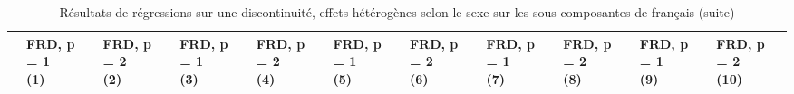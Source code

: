 \documentclass[
]{book}
\begin{document}
\begin{ThreePartTable}
\begin{longtable}[t]{lllllllllll}
\caption[]{\label{tab:agefrdcfhmodelssexessitemsfrench}Résultats de régressions sur une discontinuité, effets hétérogènes selon le sexe sur les sous-composantes de français (suite)}\\
\toprule
 & \makecell{FRD, p = 1 \\ (1) } & \makecell{FRD, p = 2 \\ (2) } & \makecell{FRD, p = 1 \\ (3) } & \makecell{FRD, p = 2 \\ (4) } & \makecell{FRD, p = 1 \\ (5) } & \makecell{FRD, p = 2 \\ (6) } & \makecell{FRD, p = 1 \\ (7) } & \makecell{FRD, p = 2 \\ (8) } & \makecell{FRD, p = 1 \\ (9) } & \makecell{FRD, p = 2 \\ (10) }\\
\midrule
\endhead


\end{longtable}
\end{ThreePartTable}
\end{document}
